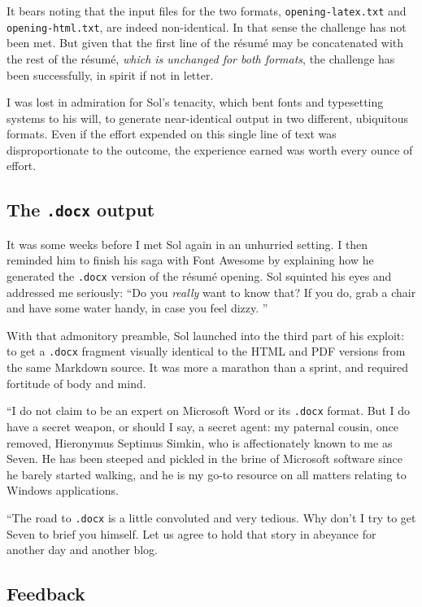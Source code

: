 \documentclass[
  british,
  a4paper,
  rgb,
  dvipsnames,
  svgnames,
  hyphens]{article}
\begin{document}
It bears noting that the input files for the two formats,
\texttt{opening-latex.txt} and \texttt{opening-html.txt}, are indeed
non-identical. In that sense the challenge has not been met. But given
that the first line of the résumé may be concatenated with the rest of
the résumé, \emph{which is unchanged for both formats}, the challenge
has been successfully, in spirit if not in letter.

I was lost in admiration for Sol's tenacity, which bent fonts and
typesetting systems to his will, to generate near-identical output in
two different, ubiquitous formats. Even if the effort expended on this
single line of text was disproportionate to the outcome, the experience
earned was worth every ounce of effort.

\hypertarget{the-.docx-output}{%
\subsection{\texorpdfstring{The \texttt{.docx}
output}{The .docx output}}\label{the-.docx-output}}

It was some weeks before I met Sol again in an unhurried setting. I then
reminded him to finish his saga with Font Awesome by explaining how he
generated the \texttt{.docx} version of the résumé opening. Sol squinted
his eyes and addressed me seriously: ``Do you \emph{really} want to know
that? If you do, grab a chair and have some water handy, in case you
feel dizzy.  \normalfont''

With that admonitory preamble, Sol launched into the third part of his
exploit: to get a \texttt{.docx} fragment visually identical to the HTML
and PDF versions from the same Markdown source. It was more a marathon
than a sprint, and required fortitude of body and mind.

``I do not claim to be an expert on Microsoft Word or its \texttt{.docx}
format. But I do have a secret weapon, or should I say, a secret agent:
my paternal cousin, once removed, Hieronymus Septimus Simkin, who is
affectionately known to me as Seven. He has been steeped and pickled in
the brine of Microsoft software since he barely started walking, and he
is my go-to resource on all matters relating to Windows applications.

``The road to \texttt{.docx} is a little convoluted and very tedious.
Why don't I try to get Seven to brief you himself. Let us agree to hold
that story in abeyance for another day and another blog.

\hypertarget{feedback}{%
\subsection{Feedback}\label{feedback}}
\end{document}
